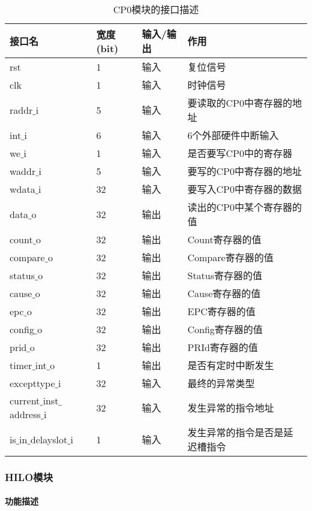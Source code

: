\quad
\begin{table}[H]
	\centering
	\caption{CP0模块的接口描述}
	\begin{tabular}{|l|l|l|l|}
		\hline
		接口名 & 宽度(bit) & 输入/输出 & 作用 \\
		\hline
		rst & 1 & 输入 & 复位信号 \\
		\hline
		clk & 1 & 输入 & 时钟信号 \\
		\hline
		raddr$\_$i & 5 & 输入 & 要读取的CP0中寄存器的地址 \\
		\hline
		int$\_$i & 6 & 输入 & 6个外部硬件中断输入 \\
		\hline
		we$\_$i & 1 & 输入 & 是否要写CP0中的寄存器 \\
		\hline
		waddr$\_$i & 5 & 输入 & 要写的CP0中寄存器的地址 \\
		\hline
		wdata$\_$i & 32 & 输入 & 要写入CP0中寄存器的数据 \\
		\hline
		data$\_$o & 32 & 输出 & 读出的CP0中某个寄存器的值 \\
		\hline
		count$\_$o & 32 & 输出 & Count寄存器的值 \\
		\hline
		compare$\_$o & 32 & 输出 & Compare寄存器的值 \\
		\hline
		status$\_$o & 32 & 输出 & Status寄存器的值 \\
		\hline
		cause$\_$o & 32 & 输出 & Cause寄存器的值 \\
		\hline
		epc$\_$o & 32 & 输出 & EPC寄存器的值 \\
		\hline
		config$\_$o & 32 & 输出 & Config寄存器的值 \\
		\hline
		prid$\_$o & 32 & 输出 & PRId寄存器的值 \\
		\hline
		timer$\_$int$\_$o & 1 & 输出 & 是否有定时中断发生 \\
		\hline
		excepttype$\_$i & 32 & 输入 & 最终的异常类型 \\
		\hline
		current$\_$inst$\_$address$\_$i & 32 & 输入 & 发生异常的指令地址 \\
		\hline
		is$\_$in$\_$delayslot$\_$i & 1 & 输入 & 发生异常的指令是否是延迟槽指令 \\
		\hline
	\end{tabular}
\end{table}
\subsubsection{HILO模块}
\paragraph{功能描述}
\quad

